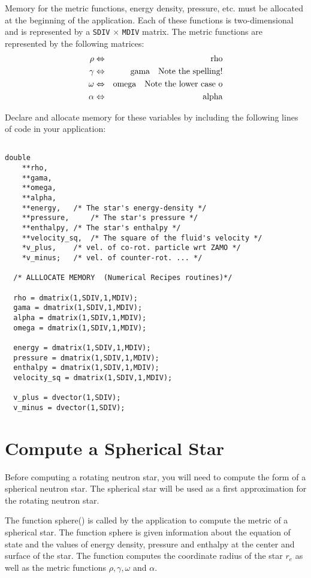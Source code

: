 Memory for the metric functions, energy density, pressure, etc. must
be allocated at the beginning of the application. Each of these 
functions is two-dimensional and is represented by a 
{\tt SDIV} $\times$ {\tt MDIV} matrix. The metric functions 
are represented by the following matrices:
\begin{eqnarray}
\rho &\Leftrightarrow& \hbox{rho} \\
\gamma &\Leftrightarrow& \hbox{gama} \quad \hbox{Note the spelling!} \\
\omega &\Leftrightarrow& \hbox{omega} \quad \hbox{Note the lower case o}\\
\alpha &\Leftrightarrow& \hbox{alpha}
\end{eqnarray}


Declare and allocate memory for these variables by including the
following lines of code in your application:

\begin{verbatim}

double 
	**rho,
	**gama,
	**omega,
	**alpha,
	**energy, 	/* The star's energy-density */
	**pressure, 	/* The star's pressure */
	**enthalpy,	/* The star's enthalpy */
	**velocity_sq,  /* The square of the fluid's velocity */
	*v_plus,	/* vel. of co-rot. particle wrt ZAMO */
   	*v_minus;	/* vel. of counter-rot. ... */

  /* ALLLOCATE MEMORY  (Numerical Recipes routines)*/

  rho = dmatrix(1,SDIV,1,MDIV);
  gama = dmatrix(1,SDIV,1,MDIV);
  alpha = dmatrix(1,SDIV,1,MDIV);
  omega = dmatrix(1,SDIV,1,MDIV);

  energy = dmatrix(1,SDIV,1,MDIV);
  pressure = dmatrix(1,SDIV,1,MDIV);
  enthalpy = dmatrix(1,SDIV,1,MDIV);
  velocity_sq = dmatrix(1,SDIV,1,MDIV);

  v_plus = dvector(1,SDIV);
  v_minus = dvector(1,SDIV);

\end{verbatim}




\section{Compute a Spherical Star}

Before computing a rotating neutron star, you will need to compute 
the form of a spherical neutron star. The spherical star will be 
used as a first approximation for the rotating neutron star. 

The function sphere() is called by the application to compute the 
metric of a spherical star. The function sphere is given information
about the equation of state and the values of energy density, 
pressure and enthalpy at the center and surface of the star. The
function computes the coordinate radius of the star $r_e$ 
as well as the metric functions $\rho, \gamma, \omega$ and $\alpha$. 

